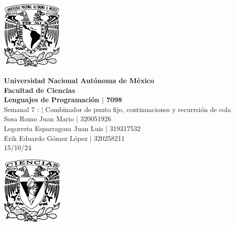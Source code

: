 \begin{center}
    \begin{minipage}{3cm}
    	\begin{center}
    		\includegraphics[height=3.4cm]{src/Img/Logo_UNAM.png}
    	\end{center}
    \end{minipage}\hfill
    \begin{minipage}{10cm}
    	\begin{center}
    	\textbf{\large Universidad Nacional Autónoma de México}\\[0.1cm]
        \textbf{Facultad de Ciencias}\\[0.1cm]
        \textbf{Lenguajes de Programación  $|$ 7098}\\[0.1cm]
        Semanal 7 : $|$ Combinador de punto fijo, continuaciones y recurrsión de cola\\[0.1cm]
        Sosa Romo Juan Mario $|$ 320051926 \\[0.1cm]
        Legorreta Esparragoza Juan Luis $|$ 319317532 \\[0.1cm]
        Erik Eduardo Gómez López $|$ 320258211 \\[0.1cm]
        15/10/24
    	\end{center}
    \end{minipage}\hfill
    \begin{minipage}{3cm}
    	\begin{center}
    		\includegraphics[height=3.4cm]{src/Img/Logo_FC.png}
    	\end{center}
    \end{minipage}
\end{center}

